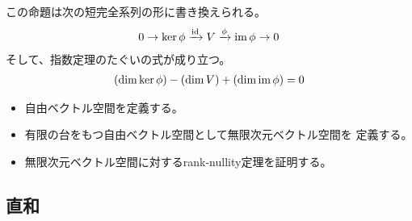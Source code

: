 	この命題は次の短完全系列の形に書き換えられる。
	\begin{equation*}\begin{split} %
		0 \to \ker\phi \xto{\myid} V \xto{\phi} \im\phi \to 0
	\end{split}\end{equation*} %
	そして、指数定理のたぐいの式が成り立つ。
	\begin{equation*}\begin{split} %
		(\dim\ker\phi) - (\dim V) + (\dim\im\phi) = 0
	\end{split}\end{equation*} %

	\begin{todo}[ここまで]\label{todo:ここまで} %
		\begin{itemize}\setlength{\itemsep}{-1mm} %
			\item 自由ベクトル空間を定義する。
			\item 有限の台をもつ自由ベクトル空間として無限次元ベクトル空間を
			定義する。
			\item 無限次元ベクトル空間に対するrank-nullity定理を証明する。
		\end{itemize} %
	\end{todo} %

\subsection{直和}\label{s2:直和} %

